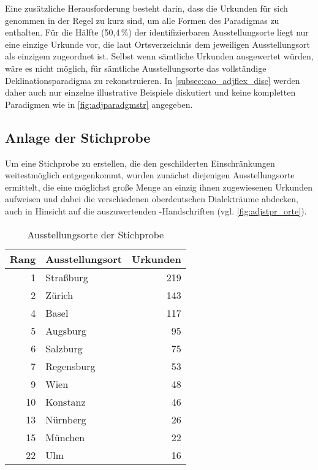 Eine zusätzliche Herausforderung besteht darin, dass die Urkunden für sich
genommen in der Regel zu kurz sind, um alle Formen des Paradigmas zu enthalten.
Für die Hälfte (50,4\,\%) der identifizierbaren Ausstellungs\-orte liegt nur
eine einzige Urkunde vor, die laut Ortsverzeichnis dem jeweiligen
Ausstellungs\-ort als einzigem zugeordnet ist. Selbst wenn sämtliche Urkunden
ausgewertet würden, wäre es nicht möglich, für sämtliche Ausstellungs\-orte das
vollständige Deklinationsparadigma zu rekonstruieren. In
\cref{subsec:cao_adjflex_disc} werden daher auch nur einzelne illustrative
Beispiele diskutiert und keine kompletten Paradigmen wie in
\cref{fig:adjparadgmstr} angegeben.

\subsection{Anlage der Stichprobe}
\label{subsec:cao_sample}

Um eine Stichprobe zu erstellen, die den geschilderten Einschränkungen
weitestmöglich entgegenkommt, wurden zunächst diejenigen Ausstellungs\-orte
ermittelt, die eine möglichst große Menge an einzig ihnen zugewiesenen Urkunden
aufweisen und dabei die verschiedenen oberdeutschen Dialekt\-räume abdecken,
auch in Hinsicht auf die auszuwertenden \KC{}-Handschriften (vgl.
\cref{fig:adjstpr_orte}).

\begin{table}
\centering
\caption{Ausstellungs\-orte der Stichprobe}
\begin{tabular}{r l r}
\toprule
Rang
	& Ausstellungs\-ort
	& Urkunden
	\\

\midrule

 1 & Straßburg  & 219 \\
 2 & Zürich     & 143 \\
 4 & Basel      & 117 \\
 5 & Augsburg   &  95 \\
 6 & Salzburg   &  75 \\
 7 & Regensburg &  53 \\
 9 & Wien       &  48 \\
10 & Konstanz	&  46 \\

\midrule

13 & Nürnberg   &  26 \\
15 & München    &  22 \\
22 & Ulm        &  16 \\

\bottomrule
\end{tabular}
\label{tab:adjstpr_orte}
\end{table}

